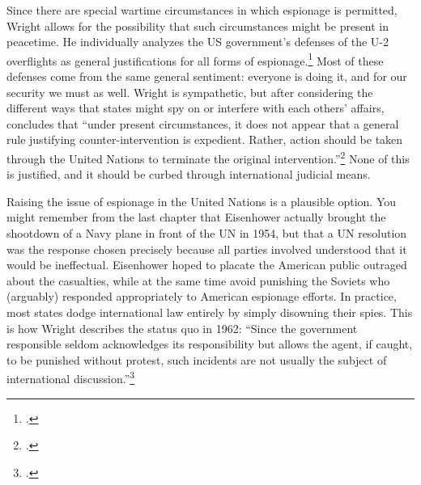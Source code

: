 \documentclass{report}
\begin{document}
\begin{refsegment}
Since there are special wartime circumstances in which espionage is permitted, Wright allows for the possibility that such circumstances might be present in peacetime. He individually analyzes the US government's defenses of the U-2 overflights as general justifications for all forms of espionage.\footcite[p.~17. A fun question to ask yourself is whether putting human spies and overflights in the same category elevates the severity of human intelligence or minimizes that of overflights. I think it actually does both, and Wright seems to agree. An overflying plane is clearly capable of greater physical destruction but ``the difference should not be exaggerated. Although a reconnaissance airplane may carry bombs, a secret agent may plant a bomb and engage in various forms of sabotage.'' (p. 21) The general lack of concern that a spy plane might be carrying bombs is consistently surprising to me. Many of these flights were in retrofitted bombers, completely indistinguishable to enemies from their heavily-armed counterparts. Nonethless, both sides seem willing to treat reconnaissance flights as their own separate thing, and that protection applies to spies as well. As long as spies \emph{don't} engage in sabotage, the fact that they have the potential to do so is irrelevant.]{wright_espionage_1962} Most of these defenses come from the same general sentiment: everyone is doing it, and for our security we must as well. Wright is sympathetic, but after considering the different ways that states might spy on or interfere with each others' affairs, concludes that ``under present circumstances, it does not appear that a general rule justifying counter-intervention is expedient. Rather, action should be taken through the United Nations to terminate the original intervention.''\footcite[p.~22]{wright_espionage_1962} None of this is justified, and it should be curbed through international judicial means.

Raising the issue of espionage in the United Nations is a plausible option. You might remember from the last chapter that Eisenhower actually brought the shootdown of a Navy plane in front of the UN in 1954, but that a UN resolution was the response chosen precisely because all parties involved understood that it would be ineffectual. Eisenhower hoped to placate the American public outraged about the casualties, while at the same time avoid punishing the Soviets who (arguably) responded appropriately to American espionage efforts. In practice, most states dodge international law entirely by simply disowning their spies. This is how Wright describes the status quo in 1962: ``Since the government responsible \textelp{} seldom acknowledges its responsibility but allows the agent, if caught, to be punished without protest, such incidents are not usually the subject of international discussion.''\footcite[p.~15. As an argument for not invoking international law, I acutally find this a bit silly. Just because a bank robber never flips on their co-conspirators does not mean those co-conspirators cannot be indicted for their role in committing the crime.]{wright_espionage_1962}


\end{refsegment}
\end{document}
